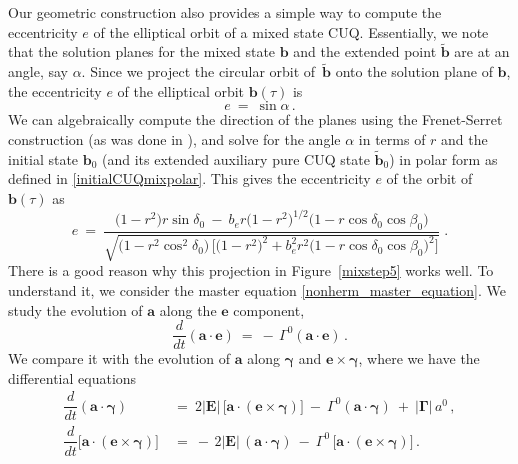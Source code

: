 \documentclass[12pt,a4paper]{article}
\begin{document}
Our geometric construction also provides a simple way to compute the eccentricity $e$ of the elliptical orbit of a mixed state CUQ. Essentially, we note that the solution planes for the mixed state $\mathbf{b}$ and the extended point $\mathbf{\widetilde{b}}$ are at an angle, say $\alpha$. Since we project the circular orbit of~$\mathbf{\widetilde{b}}$ onto the solution plane of $\mathbf{b}$, the eccentricity $e$ of the elliptical orbit $\mathbf{b}(\tau)$ is
\begin{equation}
    e\: =\: \sin{\alpha}\, .
\end{equation}
We can algebraically compute the direction of the planes using the Frenet-Serret construction (as was done in \cite{Karamitros:2025azy}), and solve for the angle $\alpha$ in terms of $r$ and the initial state $\mathbf{b}_0$ (and its extended auxiliary pure CUQ state $\mathbf{\widetilde{b}}_0$) in polar form as defined in \eqref{initialCUQmixpolar}. This gives the eccentricity $e$ of the orbit of $\mathbf{b}(\tau)$ as
\begin{equation}
   \label{eq:eccentric}
    e\ =\ \dfrac{\big(1-r^2\big)r\sin{\delta_0}\:-\:b_er\big(1-r^2\big)^{1/2}\big(1-r\cos{\delta_0}\cos{\beta_0}\big)}{\sqrt{\big(1-r^2\cos^2{\delta_0}\big)\,\big[\big(1-r^2)^2+b_e^2 r^2\big(1-r\cos{\delta_0\cos{\beta_0}}\big)^2\big]}}\;.
\end{equation}
There is a good reason why this projection in Figure~\ref{mixstep5} works well. To understand it, we consider the master equation \eqref{nonherm_master_equation}. We study the evolution of $\mathbf{a}$ along the $\mathbf{e}$ component,
\begin{equation}    \dfrac{d}{dt} (\mathbf{a}\cdot\mathbf{e})\ =\: -\,\Gamma^0 (\mathbf{a}\cdot\mathbf{e})\,.\label{Mastereq_along_e}
\end{equation}
We compare it with the evolution of $\mathbf{a}$ along $\boldsymbol{\gamma}$ and $\mathbf{e}\times\boldsymbol{\gamma}$, where we have the differential equations
\begin{equation}
    \begin{aligned} \dfrac{d}{dt} (\mathbf{a}\cdot\boldsymbol{\gamma})\ &=\ 2|\mathbf{E}|\,\big[\mathbf{a} \cdot(\mathbf{e}\times\boldsymbol{\gamma})\big]\: -\: \Gamma^0 (\mathbf{a}\cdot\boldsymbol{\gamma})\: +\:|\mathbf{\Gamma}|\,a^0\,,\\
    \dfrac{d}{dt}\big[\mathbf{a}\cdot(\mathbf{e}\times\boldsymbol{\gamma})\big]\ &=\ -\,2|\mathbf{E}|\,(\mathbf{a}\cdot\boldsymbol{\gamma})\: -\: \Gamma^0\, \big[\mathbf{a}\cdot(\mathbf{e}\times\boldsymbol{\gamma})\big]\,.    
    \end{aligned}
\label{Mastereq_along_g_and_exg}
\end{equation}
\end{document}
